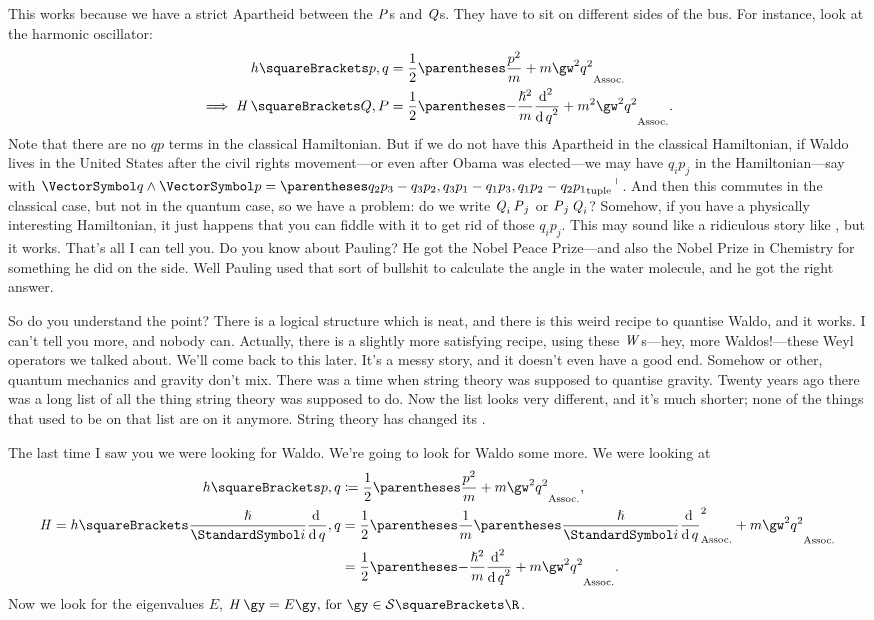 \documentclass[10pt, a4paper, twoside]{lecturenotes}
\begin{document}
This works because we have a strict Apartheid between the $\operatorname{\mathit{P}}$s and $\operatorname{\mathit{Q}}$s. They have to sit on different sides of the bus.
For instance, look at the harmonic oscillator:
\begin{align*}
h\of{p,q}&= \frac{1}{2}\pa{\frac{p^2}{m}+m\gw^2 q^2}\\
\Implies
\opH\of{Q, P} &= \frac{1}{2}\pa{-\frac{\ReducedPlanck^2}{m}\derivop[2] q + m^2 \gw^2 q^2}\text.
\end{align*}
Note that there are no $qp$ terms in the classical Hamiltonian.
But if we do not have this Apartheid in the classical Hamiltonian, if Waldo lives in the United States after the civil rights movement---or even after Obama was elected---we may have $q_i p_j$ in the Hamiltonian---say with $\vq \Exterior \vp = \smash{\Transpose{\tuple{q_2 p_3 - q_3 p_2, q_3 p_1 - q_1 p_3, q_1 p_2 - q_2 p_1}}}$. And then this commutes in the classical case, but not in the quantum case, so we have a problem: do we write $\operatorname{\mathit{Q}}_i \operatorname{\mathit{P}}_j$ or $\operatorname{\mathit{P}}_j \operatorname{\mathit{Q}}_i$? Somehow, if you have a physically interesting Hamiltonian, it just happens that you can fiddle with it to get rid of those $q_i p_j$. This may sound like a ridiculous story like , but it works. That's all I can tell you. Do you know about Pauling? He got the Nobel Peace Prize---and also the Nobel Prize in Chemistry for something he did on the side. Well Pauling used that sort of bullshit to calculate the angle in the water molecule, and he got the right answer.

So do you understand the point? There is a logical structure which is neat, and there is this weird recipe to quantise Waldo, and it works. I can't tell you more, and nobody can. Actually, there is a slightly more satisfying recipe, using these $\operatorname{\mathit{W}}$s---hey, more Waldos!---these Weyl operators we talked about. We'll come back to this later. It's a messy story, and it doesn't even have a good end. Somehow or other, quantum mechanics and gravity don't mix. There was a time when string theory was supposed to quantise gravity. Twenty years ago there was a long list of all the thing string theory was supposed to do. Now the list looks very different, and it's much shorter; none of the things that used to be on that list are on it anymore. String theory has changed its .


\NewLecture[date=2013-04-18]
\newcommand{\redH}{\operatorname{\mathit{\textcolor{red}{H}}}}
The last time I saw you we were looking for Waldo. We're going to look for Waldo some more. We were looking at
\begin{align*}
h\of{p,q} &\DefineAs \frac{1}{2}\pa{\frac{p^2}{m}+m\gw^2q^2}\text,\\
\opH=h\of{\frac{\ReducedPlanck}{\I}\derivop q, q} &= \frac{1}{2}\pa{\frac{1}{m}\pa{\frac{\ReducedPlanck}{\I}\derivop q}^2+m\gw^2 q^2}\\
&=\frac{1}{2}\pa{-\frac{\ReducedPlanck^2}{m}\derivop[2] q + m\gw^2 q^2}\text.
\end{align*}
Now we look for the eigenvalues $E$, $\opH\gy = E \gy \text{, for }\gy\in\SchwartzSpace\of\R$.
\end{document}
